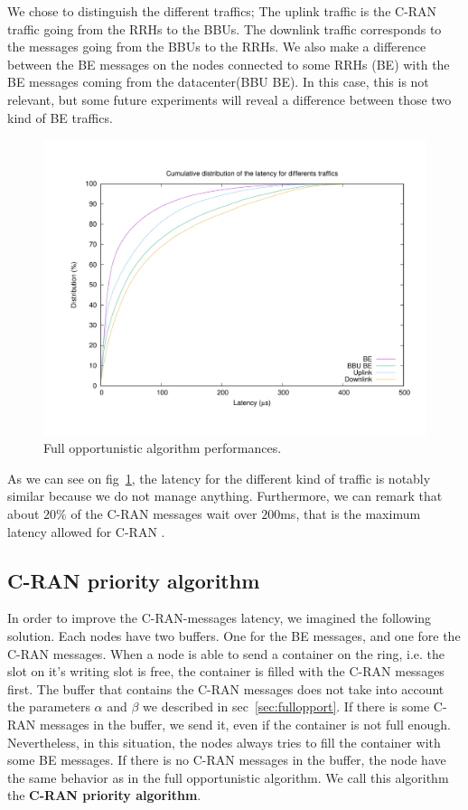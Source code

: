 \documentclass[a4paper,10pt,french,english]{article}
\begin{document}
We chose to distinguish the different traffics; The uplink traffic is the C-RAN traffic going from the RRHs to the BBUs. The downlink traffic corresponds to the messages going from the BBUs to the RRHs. We also make a difference between the BE messages on the nodes connected to some RRHs (BE) with the BE messages coming from the datacenter(BBU BE). In this case, this is not relevant, but some future experiments will reveal a difference between those two kind of BE traffics.
    \begin{figure}[h!]
    \label{fig:oport}
        \begin{center}
      \includegraphics[scale=0.4]{oport}

      \caption{Full opportunistic algorithm performances.}
      \end{center}
  \end{figure}
  
  As we can see on fig~\ref{fig:oport}, the latency for the different kind of traffic is notably similar because we do not manage anything. Furthermore, we can remark that about $20\%$ of the C-RAN messages wait over $200$ms, that is the maximum latency allowed for C-RAN \cite{REF}.

\subsection{C-RAN priority algorithm}
  In order to improve the C-RAN-messages latency, we imagined the following solution. Each nodes have two buffers. One for the BE messages, and one fore the C-RAN messages. When a node is able to send a container on the ring, i.e. the slot on it's writing slot is free, the container is filled with the C-RAN messages first. The buffer that contains the C-RAN messages does not take into account the parameters $\alpha$ and $\beta$ we described in sec~\ref{sec:fullopport}. If there is some C-RAN messages in the buffer, we send it, even if the container is not full enough. Nevertheless, in this situation, the nodes always tries to fill the container with some BE messages. If there is no C-RAN messages in the buffer, the node have the same behavior as in the full opportunistic algorithm. We call this algorithm the {\bf C-RAN priority algorithm}.
  
\end{document}
